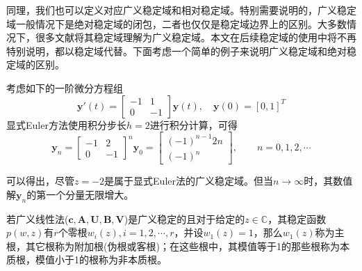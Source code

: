 同理，我们也可以定义对应广义稳定域和相对稳定域。特别需要说明的，广义稳定域一般情况下是绝对稳定域的闭包，二者也仅仅是稳定域边界上的区别。大多数情况下，很多文献将其稳定域理解为广义稳定域。本文在后续稳定域的使用中将不再特别说明，都以稳定域代替。下面考虑一个简单的例子\cite{李寿佛2010}来说明广义稳定域和绝对稳定域的区别。

考虑如下的一阶微分方程组
\begin{equation}
\bm{y}'(t)=\begin{bmatrix}
-1 & 1\\ 0 & -1
\end{bmatrix}\bm{y}(t),\quad \bm{y}(0)=[0,1]^T
\end{equation}
显式Euler方法使用积分步长$h=2$进行积分计算，可得
\begin{equation}
\bm{y}_n=\begin{bmatrix}
-1 & 2\\ 0 & -1
\end{bmatrix}^n\bm{y}_0=\begin{bmatrix}
(-1)^{n-1}2n\\ (-1)^n
\end{bmatrix},\qquad n=0,1,2,\cdots
\end{equation}

可以得出，尽管$z=-2$是属于显式Euler法的广义稳定域。但当$n\to\infty$时，其数值解$\bm{y}_n$的第一个分量无限增大。

\begin{definition}
若广义线性法($\bm{c},\bm{A},\bm{U},\bm{B},\bm{V}$)是广义稳定的且对于给定的$z\in\mathbb{C}$，其稳定函数$p(w,z)$有$r$个零根$w_i(z),i=1,2,\cdots,r$，并设$w_1(z)=1$，那么$w_1(z)$称为主根，其它根称为附加根(伪根或客根)；在这些根中，其模值等于1的那些根称为本质根，模值小于1的根称为非本质根\cite{李寿佛2010}。
\end{definition}

